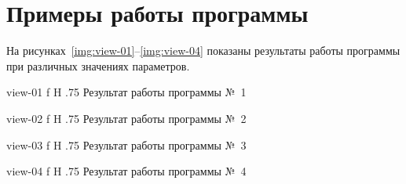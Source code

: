\documentclass{bmstu}
\begin{document}
\chapter{Примеры работы программы}

На рисунках~\ref{img:view-01}--\ref{img:view-04} показаны результаты работы программы при различных значениях параметров.

    {view-01}
    {f}
    {H}
    {.75\textwidth}
    {Результат работы программы №~1}
    
    {view-02}
    {f}
    {H}
    {.75\textwidth}
    {Результат работы программы №~2}
    
    {view-03}
    {f}
    {H}
    {.75\textwidth}
    {Результат работы программы №~3}
    
    {view-04}
    {f}
    {H}
    {.75\textwidth}
    {Результат работы программы №~4}
\end{document}
